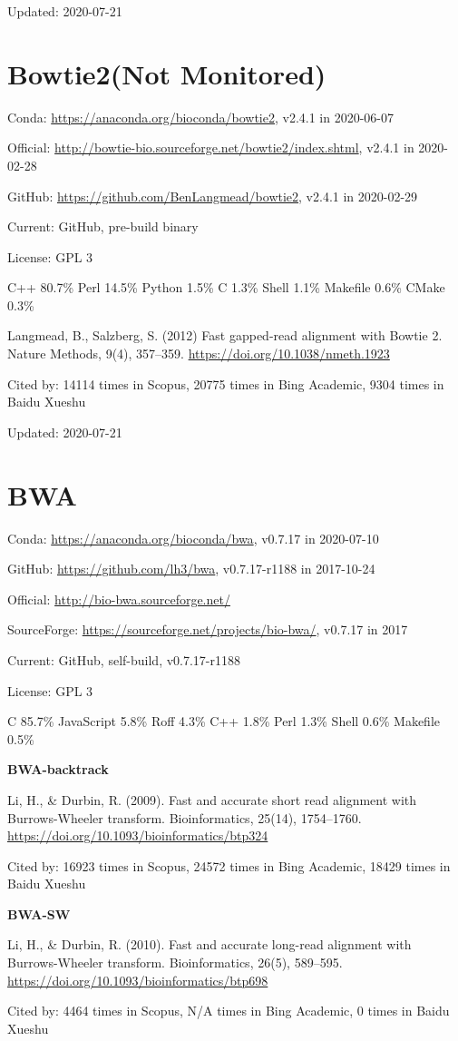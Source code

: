\documentclass[]{article}
\newcommand{\nm}{{\color{red}(Not Monitored)}}
\newcommand{\cb}[3]{\par Cited by: {\color{blue}\Huge #1} times in Scopus, {\color{blue}\Huge #2} times in Bing Academic, {\color{blue}\Huge #3} times in Baidu Xueshu}
\begin{document}
Updated: 2020-07-21

\section{Bowtie2\nm}

Conda: \url{https://anaconda.org/bioconda/bowtie2}, v2.4.1 in 2020-06-07

Official: \url{http://bowtie-bio.sourceforge.net/bowtie2/index.shtml}, v2.4.1 in 2020-02-28

GitHub: \url{https://github.com/BenLangmead/bowtie2}, v2.4.1 in 2020-02-29

Current: GitHub, pre-build binary

License: GPL 3

C++ 80.7\% Perl 14.5\% Python 1.5\% C 1.3\% Shell 1.1\% Makefile 0.6\% CMake 0.3\%

Langmead, B., Salzberg, S. (2012) Fast gapped-read alignment with Bowtie 2. Nature Methods, 9(4), 357–359. \url{https://doi.org/10.1038/nmeth.1923}\cb{14114}{20775}{9304}

Updated: 2020-07-21

\section{BWA}

Conda: \url{https://anaconda.org/bioconda/bwa}, v0.7.17 in 2020-07-10

GitHub: \url{https://github.com/lh3/bwa}, v0.7.17-r1188 in 2017-10-24

Official: \url{http://bio-bwa.sourceforge.net/}

SourceForge: \url{https://sourceforge.net/projects/bio-bwa/}, v0.7.17 in 2017

Current: GitHub, self-build, v0.7.17-r1188

License: GPL 3

C 85.7\% JavaScript 5.8\% Roff 4.3\% C++ 1.8\% Perl 1.3\% Shell 0.6\% Makefile 0.5\%

\textbf{BWA-backtrack}

Li, H., \& Durbin, R. (2009). Fast and accurate short read alignment with Burrows-Wheeler transform. Bioinformatics, 25(14), 1754–1760. \url{https://doi.org/10.1093/bioinformatics/btp324}\cb{16923}{24572}{18429}

\textbf{BWA-SW}

Li, H., \& Durbin, R. (2010). Fast and accurate long-read alignment with Burrows-Wheeler transform. Bioinformatics, 26(5), 589–595. \url{https://doi.org/10.1093/bioinformatics/btp698}\cb{4464}{N/A}{0}
\end{document}
